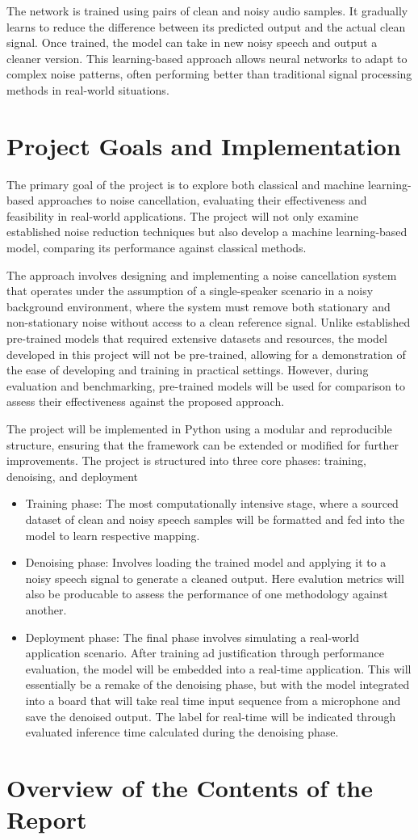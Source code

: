 The network is trained using pairs of clean and noisy audio samples. It gradually learns to reduce the difference between its predicted output and the actual clean signal. Once trained, the model can take in new noisy speech and output a cleaner version. This learning-based approach allows neural networks to adapt to complex noise patterns, often performing better than traditional signal processing methods in real-world situations.

\section{Project Goals and Implementation}

The primary goal of the project is to explore both classical and machine learning-based approaches to noise cancellation, evaluating their effectiveness and feasibility in real-world applications. The project will not only examine established noise reduction techniques but also develop a machine learning-based model, comparing its performance against classical methods.

The approach involves designing and implementing a noise cancellation system that operates under the assumption of a single-speaker scenario in a noisy background environment, where the system must remove both stationary and non-stationary noise without access to a clean reference signal. Unlike established pre-trained models that required extensive datasets and resources, the model developed in this project will not be pre-trained, allowing for a demonstration of the ease of developing and training in practical settings. However, during evaluation and benchmarking, pre-trained models will be used for comparison to assess their effectiveness against the proposed approach.

The project will be implemented in Python using a modular and reproducible structure, ensuring that the framework can be extended or modified for further improvements. The project is structured into three core phases: training, denoising, and deployment
\begin{itemize}
    \item Training phase: The most computationally intensive stage, where a sourced dataset of clean and noisy speech samples will be formatted and fed into the model to learn respective mapping.
    \item Denoising phase: Involves loading the trained model and applying it to a noisy speech signal to generate a cleaned output. Here evalution metrics will also be producable to assess the performance of one methodology against another.
    \item Deployment phase: The final phase involves simulating a real-world application scenario. After training ad justification through performance evaluation, the model will be embedded into a real-time application. This will essentially be a remake of the denoising phase, but with the model integrated into a board that will take real time input sequence from a microphone and save the denoised output. The label for real-time will be indicated through evaluated inference time calculated during the denoising phase.
\end{itemize}


\section{Overview of the Contents of the Report}